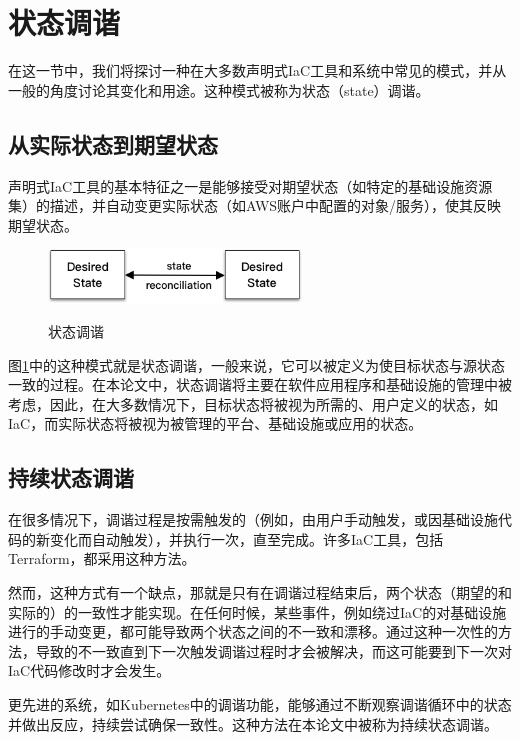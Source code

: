 \documentclass[macfonts,master]{njuthesis}
\begin{document}
\section{状态调谐}\label{section:reconciliation}

在这一节中，我们将探讨一种在大多数声明式IaC工具和系统中常见的模式，并从一般的角度讨论其变化和用途。这种模式被称为状态（state）调谐。

\subsection{从实际状态到期望状态}

声明式IaC工具的基本特征之一是能够接受对期望状态（如特定的基础设施资源集）的描述，并自动变更实际状态（如AWS账户中配置的对象/服务），使其反映期望状态。

\begin{figure}[htbp]
  \centering
  \includegraphics[width=0.6\textwidth]{pics/simple-state-reconciliation.png}\\
  \caption{状态调谐}\label{fig:ssr}
\end{figure}

图\ref{fig:ssr}中的这种模式就是状态调谐，一般来说，它可以被定义为使目标状态与源状态一致的过程。在本论文中，状态调谐将主要在软件应用程序和基础设施的管理中被考虑，因此，在大多数情况下，目标状态将被视为所需的、用户定义的状态，如IaC，而实际状态将被视为被管理的平台、基础设施或应用的状态。

\subsection{持续状态调谐}\label{section:continus-reconciliation}

在很多情况下，调谐过程是按需触发的（例如，由用户手动触发，或因基础设施代码的新变化而自动触发），并执行一次，直至完成。许多IaC工具，包括Terraform，都采用这种方法。

然而，这种方式有一个缺点，那就是只有在调谐过程结束后，两个状态（期望的和实际的）的一致性才能实现。在任何时候，某些事件，例如绕过IaC的对基础设施进行的手动变更，都可能导致两个状态之间的不一致和漂移。通过这种一次性的方法，导致的不一致直到下一次触发调谐过程时才会被解决，而这可能要到下一次对IaC代码修改时才会发生。

更先进的系统，如Kubernetes中的调谐功能，能够通过不断观察调谐循环中的状态并做出反应，持续尝试确保一致性。这种方法在本论文中被称为持续状态调谐。
\end{document}
